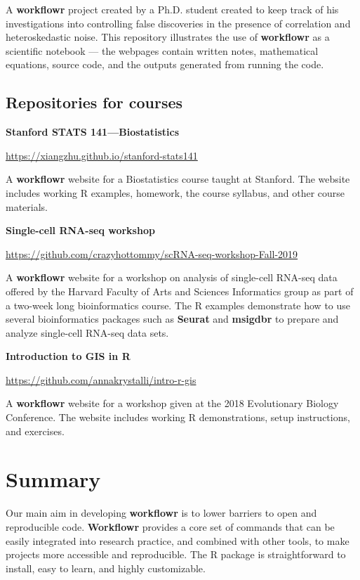 \documentclass[9pt,a4paper]{extarticle}
\begin{document}
A \textbf{workflowr} project created by a Ph.D. student created to keep track of
his investigations into controlling false discoveries in the presence of
correlation and heteroskedastic noise. This repository illustrates the
use of \textbf{workflowr} as a scientific notebook --- the webpages contain
written notes, mathematical equations, source code, and the outputs
generated from running the code.

\subsection*{Repositories for courses}

\textbf{Stanford STATS 141—Biostatistics}

\url{https://xiangzhu.github.io/stanford-stats141}

A \textbf{workflowr} website for a Biostatistics course taught at Stanford. The
website includes working R examples, homework, the course syllabus, and
other course materials.

\textbf{Single-cell RNA-seq workshop}

\url{https://github.com/crazyhottommy/scRNA-seq-workshop-Fall-2019}

A \textbf{workflowr} website for a workshop on analysis of single-cell RNA-seq
data offered by the Harvard Faculty of Arts and Sciences Informatics
group as part of a two-week long bioinformatics course. The R examples
demonstrate how to use several bioinformatics packages such as \textbf{Seurat}
and \textbf{msigdbr} to prepare and analyze single-cell RNA-seq data sets.

\textbf{Introduction to GIS in R}

\url{https://github.com/annakrystalli/intro-r-gis}

A \textbf{workflowr} website for a workshop given at the 2018 Evolutionary
Biology Conference. The website includes working R demonstrations, setup
instructions, and exercises.


\section*{Summary}

Our main aim in developing \textbf{workflowr} is to lower barriers to open and
reproducible code. \textbf{Workflowr} provides a core set of commands that can be
easily integrated into research practice, and combined with other tools,
to make projects more accessible and reproducible. The R package is
straightforward to install, easy to learn, and highly customizable.
\end{document}
